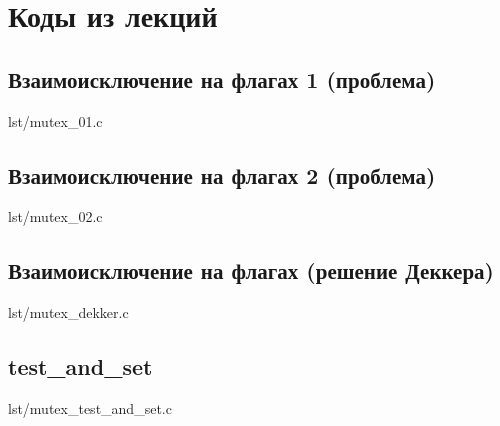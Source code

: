 \section{Коды из лекций}

\subsection{Взаимоисключение на флагах 1 (проблема)}

\begin{lstinputlisting}[
        label={lst:},
        caption={}
    ]{lst/mutex_01.c}
\end{lstinputlisting}

\newpage

\subsection{Взаимоисключение на флагах 2 (проблема)}

\begin{lstinputlisting}[
        label={lst:},
        caption={}
    ]{lst/mutex_02.c}
\end{lstinputlisting}

\newpage

\subsection{Взаимоисключение на флагах (решение Деккера)}

\begin{lstinputlisting}[
        label={lst:},
        caption={}
    ]{lst/mutex_dekker.c}
\end{lstinputlisting}

\newpage

\subsection{test\_and\_set}

\begin{lstinputlisting}[
        label={lst:},
        caption={}
    ]{lst/mutex_test_and_set.c}
\end{lstinputlisting}

